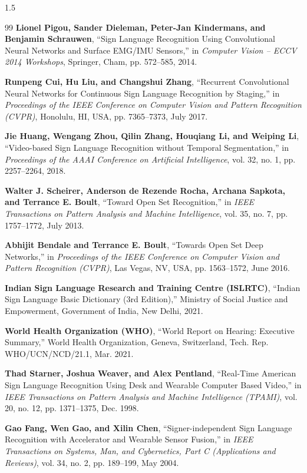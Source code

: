 \begin{spacing}{1.5}
\begin{thebibliography}{99}
 \textbf{Lionel Pigou, Sander Dieleman, Peter-Jan Kindermans, and Benjamin Schrauwen}, ``Sign Language Recognition Using Convolutional Neural Networks and Surface EMG/IMU Sensors,'' in \textit{Computer Vision -- ECCV 2014 Workshops}, Springer, Cham, pp. 572--585, 2014.

 \textbf{Runpeng Cui, Hu Liu, and Changshui Zhang}, ``Recurrent Convolutional Neural Networks for Continuous Sign Language Recognition by Staging,'' in \textit{Proceedings of the IEEE Conference on Computer Vision and Pattern Recognition (CVPR)}, Honolulu, HI, USA, pp. 7365--7373, July 2017.

 \textbf{Jie Huang, Wengang Zhou, Qilin Zhang, Houqiang Li, and Weiping Li}, ``Video-based Sign Language Recognition without Temporal Segmentation,'' in \textit{Proceedings of the AAAI Conference on Artificial Intelligence}, vol. 32, no. 1, pp. 2257--2264, 2018.

 \textbf{Walter J. Scheirer, Anderson de Rezende Rocha, Archana Sapkota, and Terrance E. Boult}, ``Toward Open Set Recognition,'' in \textit{IEEE Transactions on Pattern Analysis and Machine Intelligence}, vol. 35, no. 7, pp. 1757--1772, July 2013.

 \textbf{Abhijit Bendale and Terrance E. Boult}, ``Towards Open Set Deep Networks,'' in \textit{Proceedings of the IEEE Conference on Computer Vision and Pattern Recognition (CVPR)}, Las Vegas, NV, USA, pp. 1563--1572, June 2016.

 \textbf{Indian Sign Language Research and Training Centre (ISLRTC)}, ``Indian Sign Language Basic Dictionary (3rd Edition),'' Ministry of Social Justice and Empowerment, Government of India, New Delhi, 2021.

 \textbf{World Health Organization (WHO)}, ``World Report on Hearing: Executive Summary,'' World Health Organization, Geneva, Switzerland, Tech. Rep. WHO/UCN/NCD/21.1, Mar. 2021.

 \textbf{Thad Starner, Joshua Weaver, and Alex Pentland}, ``Real-Time American Sign Language Recognition Using Desk and Wearable Computer Based Video,'' in \textit{IEEE Transactions on Pattern Analysis and Machine Intelligence (TPAMI)}, vol. 20, no. 12, pp. 1371--1375, Dec. 1998.

 \textbf{Gao Fang, Wen Gao, and Xilin Chen}, ``Signer-independent Sign Language Recognition with Accelerator and Wearable Sensor Fusion,'' in \textit{IEEE Transactions on Systems, Man, and Cybernetics, Part C (Applications and Reviews)}, vol. 34, no. 2, pp. 189--199, May 2004.


\end{thebibliography}
\end{spacing}

